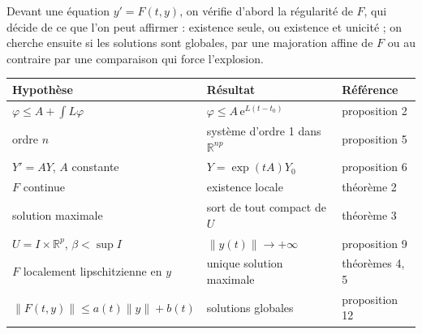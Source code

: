 \documentclass[a4paper,twoside]{report}
\newcommand{\R}{\mathbb{R}}
\newcommand{\ee}{\mathrm{e}}                      %
\newcommand{\norme}[1]{\lVert #1 \rVert}         %
\begin{document}
Devant une équation $y' = F(t, y)$, on vérifie d'abord la régularité de $F$, qui décide de ce que l'on peut affirmer : existence seule, ou existence et unicité ; on cherche ensuite si les solutions sont globales, par une majoration affine de $F$ ou au contraire par une comparaison qui force l'explosion.

\begin{center}
\renewcommand{\arraystretch}{1.35}
\begin{tabularx}{15cm}{|>{\raggedright\arraybackslash}p{4.6cm}|>{\raggedright\arraybackslash}X|>{\centering\arraybackslash}p{2.4cm}|}
\hline
\rowcolor{couleurD!35} \textbf{Hypothèse} & \textbf{Résultat} & \textbf{Référence} \\ \hline
$\varphi \leqslant A + \int L\varphi$ & $\varphi \leqslant A\,\ee^{L(t - t_{0})}$ & proposition 2 \\ \hline
ordre $n$ & système d'ordre 1 dans $\R^{np}$ & proposition 5 \\ \hline
$Y' = AY$, $A$ constante & $Y = \exp(tA)Y_{0}$ & proposition 6 \\ \hline
$F$ continue & existence locale & théorème 2 \\ \hline
solution maximale & sort de tout compact de $U$ & théorème 3 \\ \hline
$U = I \times \R^{p}$, $\beta < \sup I$ & $\norme{y(t)} \to +\infty$ & proposition 9 \\ \hline
$F$ localement lipschitzienne en $y$ & unique solution maximale & théorèmes 4, 5 \\ \hline
$\norme{F(t, y)} \leqslant a(t)\norme{y} + b(t)$ & solutions globales & proposition 12 \\ \hline
\end{tabularx}
\end{center}

\begin{center}
\end{center}
\end{document}
